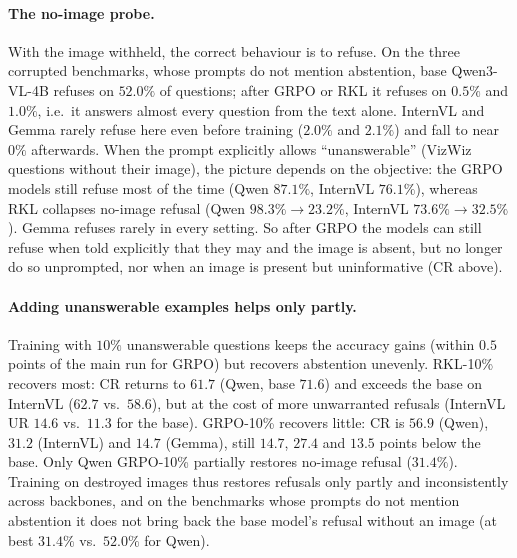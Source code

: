\paragraph{The no-image probe.}
With the image withheld, the correct behaviour is to refuse. On the three corrupted
benchmarks, whose prompts do not mention abstention, base Qwen3-VL-4B refuses on $52.0\%$
of questions; after GRPO or RKL it refuses on $0.5\%$ and $1.0\%$, i.e.\ it answers almost
every question from the text alone. InternVL and Gemma rarely refuse here even before
training ($2.0\%$ and $2.1\%$) and fall to near $0\%$ afterwards. When the prompt explicitly
allows ``unanswerable'' (VizWiz questions without their image), the picture depends on the
objective: the GRPO models still refuse most of the time (Qwen $87.1\%$, InternVL $76.1\%$),
whereas RKL collapses no-image refusal (Qwen $98.3\%\rightarrow23.2\%$, InternVL
$73.6\%\rightarrow32.5\%$). Gemma refuses rarely in every setting. So after GRPO the models
can still refuse when told explicitly that they may and the image is absent, but no longer
do so unprompted, nor when an image is present but uninformative (CR above).

\paragraph{Adding unanswerable examples helps only partly.}
Training with $10\%$ unanswerable questions keeps the accuracy gains (within $0.5$ points of
the main run for GRPO) but recovers abstention unevenly. RKL-10\% recovers most: CR returns
to $61.7$ (Qwen, base $71.6$) and exceeds the base on InternVL ($62.7$ vs.\ $58.6$), but at
the cost of more unwarranted refusals (InternVL UR $14.6$ vs.\ $11.3$ for the base). GRPO-10\%
recovers little: CR is $56.9$ (Qwen), $31.2$ (InternVL) and $14.7$ (Gemma), still $14.7$,
$27.4$ and $13.5$ points below the base. Only Qwen GRPO-10\% partially restores no-image
refusal ($31.4\%$). Training on destroyed images thus restores refusals only partly and inconsistently across
backbones, and on the benchmarks whose prompts do not mention abstention it does not bring
back the base model's refusal without an image (at best $31.4\%$ vs.\ $52.0\%$ for Qwen).

